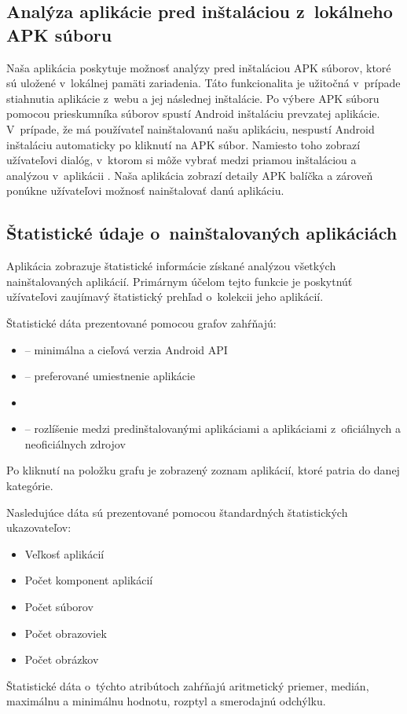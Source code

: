\subsection{Analýza aplikácie pred inštaláciou z~lokálneho APK súboru}
Naša aplikácia poskytuje možnosť analýzy pred inštaláciou APK súborov, ktoré sú uložené v~lokálnej pamäti zariadenia. Táto funkcionalita je užitočná v~prípade stiahnutia aplikácie z~webu a jej následnej inštalácie. Po výbere APK súboru pomocou prieskumníka súborov spustí Android inštaláciu prevzatej aplikácie. V~prípade, že má používateľ nainštalovanú našu aplikáciu, nespustí Android inštaláciu automaticky po kliknutí na APK súbor. Namiesto toho zobrazí užívateľovi dialóg, v~ktorom si môže vybrať medzi priamou inštaláciou a analýzou v~aplikácii . Naša aplikácia zobrazí detaily APK balíčka a zároveň ponúkne užívateľovi možnosť nainštalovať danú aplikáciu.

\subsection{Štatistické údaje o~nainštalovaných aplikáciách}
Aplikácia zobrazuje štatistické informácie získané analýzou všetkých nainštalovaných aplikácií. Primárnym účelom tejto funkcie je poskytnúť užívateľovi zaujímavý štatistický prehľad o~kolekcii jeho aplikácií. 

\noindent Štatistické dáta prezentované pomocou grafov zahŕňajú:
\begin{itemize}
	\item {} -- minimálna a cieľová verzia Android API
	\item {} -- preferované umiestnenie aplikácie
	\item {}
	\item {} -- rozlíšenie medzi predinštalovanými aplikáciami a aplikáciami z~oficiálnych a neoficiálnych zdrojov 
\end{itemize}

\noindent Po kliknutí na položku grafu je zobrazený zoznam aplikácií, ktoré patria do danej kategórie.

\noindent Nasledujúce dáta sú prezentované pomocou štandardných štatistických ukazovateľov:
\begin{itemize}
	\item Veľkosť aplikácií
	\item Počet komponent aplikácií
	\item Počet súborov
	\item Počet obrazoviek
	\item Počet obrázkov
\end{itemize}
Štatistické dáta o~týchto atribútoch zahŕňajú aritmetický priemer, medián, maximálnu a minimálnu hodnotu, rozptyl a smerodajnú odchýlku. 


